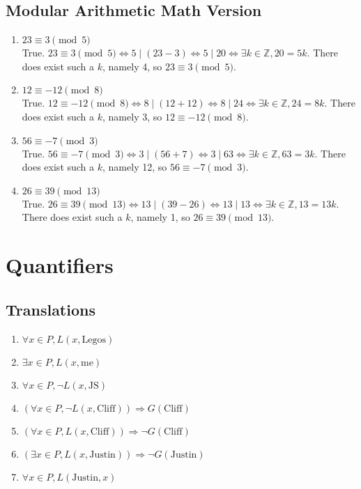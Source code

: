 \documentclass[12pt, leqno]{article}
\newcommand{\Z}{\mathbb{Z}}
\begin{document}
\subsection{Modular Arithmetic Math Version}

\begin{enumerate}
    \item $23 \equiv 3 \pmod{5}$\\
    True. $23 \equiv 3 \pmod{5} \Leftrightarrow 5 \mid (23 - 3) \Leftrightarrow 5 \mid 20 \Leftrightarrow \exists k \in \Z, 20 = 5k$. There does exist such a $k$, namely 4, so $23 \equiv 3 \pmod{5}$.
    \item $12 \equiv -12 \pmod{8}$\\
    True. $12 \equiv -12 \pmod{8} \Leftrightarrow 8 \mid (12 + 12) \Leftrightarrow 8 \mid 24 \Leftrightarrow \exists k \in \Z, 24 = 8k$. There does exist such a $k$, namely 3, so $12 \equiv -12 \pmod{8}$.
    \item $56 \equiv -7 \pmod{3}$\\
    True. $56 \equiv -7 \pmod{3} \Leftrightarrow 3 \mid (56 + 7) \Leftrightarrow 3 \mid 63 \Leftrightarrow \exists k \in \Z, 63 = 3k$. There does exist such a $k$, namely 12, so $56 \equiv -7 \pmod{3}$.
    \item $26 \equiv 39 \pmod{13}$\\
    True. $26 \equiv 39 \pmod{13} \Leftrightarrow 13 \mid (39 - 26) \Leftrightarrow 13 \mid 13 \Leftrightarrow \exists k \in \Z, 13 = 13k$. There does exist such a $k$, namely 1, so $26 \equiv 39 \pmod{13}$.
\end{enumerate}

\section{Quantifiers}

\subsection{Translations}

\begin{enumerate}
    \item $\forall x \in P, L(x, \mathrm{Legos})$
    \item $\exists x \in P, L(x, \mathrm{me})$
    \item $\forall x \in P, \neg L(x, \mathrm{JS})$
    \item $(\forall x \in P, \neg L(x, \mathrm{Cliff})) \Rightarrow G(\mathrm{Cliff})$
    \item $(\forall x \in P, L(x, \mathrm{Cliff})) \Rightarrow \neg G(\mathrm{Cliff})$
    \item $(\exists x \in P, L(x, \mathrm{Justin})) \Rightarrow \neg G(\mathrm{Justin})$
    \item $\forall x \in P, L(\mathrm{Justin}, x)$
\end{enumerate}
\end{document}
